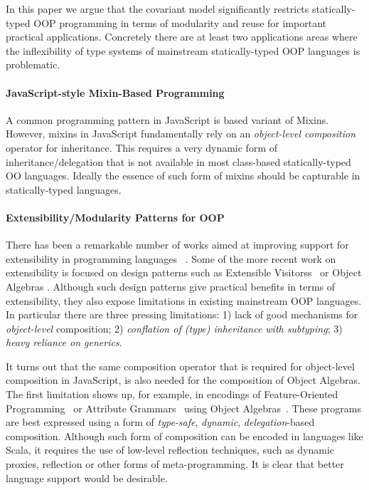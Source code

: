 In this paper we argue that the covariant model significantly
restricts statically-typed OOP programming in terms of modularity and
reuse for important practical applications. 
Concretely there are at least two applications areas where the
inflexibility of type systems of mainstream statically-typed OOP
languages is problematic.

\paragraph{\bf JavaScript-style Mixin-Based Programming}
A common programming pattern in JavaScript is based variant of Mixins. 
However, mixins in JavaScript fundamentally rely on an \emph{object-level composition}
operator for inheritance. This requires a very dynamic form of
inheritance/delegation that is not available in most class-based 
statically-typed OO languages. Ideally the essence of such 
form of mixins should be capturable in statically-typed languages. 

\paragraph{\bf Extensibility/Modularity Patterns for OOP}
There has been a remarkable number of works aimed at improving support
for extensibility in programming languages
~\cite{Prehofer97,Tarr99ndegrees,Harrison93subject,McDirmid01Jiazzi,Aracic06CaesarJ,Smaragdakis98mixin,nystrom2006j,togersen:2004,Zenger-Odersky2005,oliveira09modular,oliveira2012extensibility}. 
Some of the more recent work on extensibility is focused on design
patterns such as Extensible
Visitorss~\cite{togersen:2004,oliveira09modular} or Object Algebras \cite{oliveira2012extensibility}.
Although such design patterns give practical benefits in terms of
extensibility, they also expose limitations in existing mainstream OOP
languages. In particular there are three pressing limitations: 
1) lack of good mechanisms for
  \emph{object-level} composition; 2) \emph{conflation of 
    (type) inheritance with subtyping}; 3) \emph{heavy reliance on generics}.

It turns out that the same composition operator that is required for 
object-level composition in JavaScript, is also needed for the
composition of Object Algebras.
The first limitation shows up, for example, in encodings of Feature-Oriented
Programming~\cite{Prehofer97} or Attribute Grammars~\cite{Knuth1968} using Object
Algebras~\cite{oliveira2013feature,rendel14attributes}. These programs are best
expressed using a form of \emph{type-safe}, \emph{dynamic},
\emph{delegation}-based composition. Although such form of
composition can be encoded in languages like Scala, it requires the
use of low-level reflection techniques, such as dynamic proxies,
reflection or other forms of meta-programming. It is clear
that better language support would be desirable.


